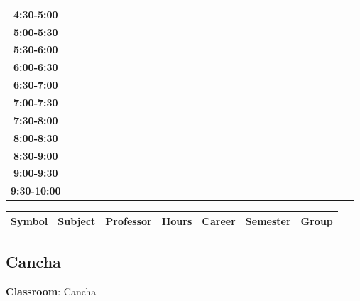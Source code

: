 \documentclass{article}
\begin{document}
\begin{table}[ht]
\begin{tabular}{|c|c|c|c|c|c|c|c|c|c|c|c|c|c|c|c|c|c|c|c|c|c|c|c|c|c|c|c|c|c|}
 \cline{1-8} 
\textbf{4:30-5:00} &   &   &   &   &   &   &   \\
 \cline{1-8} 
\textbf{5:00-5:30} &   &   &   &   &   &   &   \\
 \cline{1-8} 
\textbf{5:30-6:00} &   &   &   &   &   &   &   \\
 \cline{1-8} 
\textbf{6:00-6:30} &   &   &   &   &   &   &   \\
 \cline{1-8} 
\textbf{6:30-7:00} &   &   &   &   &   &   &   \\
 \cline{1-8} 
\textbf{7:00-7:30} &   &   &   &   &   &   &   \\
 \cline{1-8} 
\textbf{7:30-8:00} &   &   &   &   &   &   &   \\
 \cline{1-8} 
\textbf{8:00-8:30} &   &   &   &   &   &   &   \\
 \cline{1-8} 
\textbf{8:30-9:00} &   &   &   &   &   &   &   \\
 \cline{1-8} 
\textbf{9:00-9:30} &   &   &   &   &   &   &   \\
 \cline{1-8} 
\textbf{9:30-10:00} &   &   &   &   &   &   &   \\
 \cline{1-8} 
\end{tabular}\end{table}

        
        \begin{tabular}{|>{\centering\arraybackslash}m{2cm}|>{\centering\arraybackslash}m{4cm}|>{\centering\arraybackslash}m{2.15cm}|>{\centering\arraybackslash}m{1.8cm}|>{\centering\arraybackslash}m{2cm}|>{\centering\arraybackslash}m{2cm}|>{\centering\arraybackslash}m{2cm}|}
        \hline
        \textbf{Symbol} & \textbf{Subject} & \textbf{Professor} & \textbf{Hours} & \textbf{Career} & \textbf{Semester} & \textbf{Group} \\
        \hline
        \end{tabular}
                    

        \newpage
        

        \subsection{Cancha}
        \vspace*{.1cm}
        
        \begin{flushright}
            {\LARGE \textbf{Classroom}: Cancha}
        \end{flushright}
        \vspace{1cm}
\end{document}
